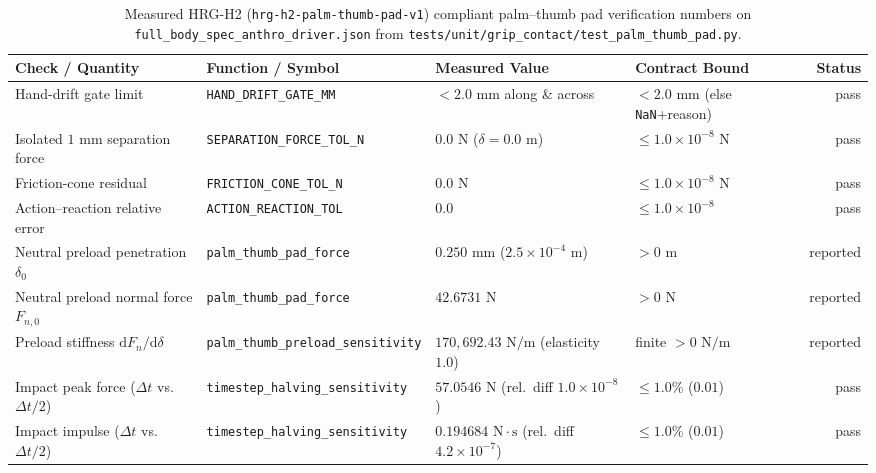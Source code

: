 \documentclass[11pt,a4paper]{article}
\begin{document}
\begin{table}[htbp]
\centering
\scriptsize
\begin{tabular}{llllr}
\toprule
\textbf{Check / Quantity} & \textbf{Function / Symbol} & \textbf{Measured Value} & \textbf{Contract Bound} & \textbf{Status} \\
\midrule
Hand-drift gate limit & \texttt{HAND\_DRIFT\_GATE\_MM} & $< 2.0\text{ mm}$ along \& across & $< 2.0\text{ mm}$ (else \texttt{NaN}+reason) & pass \\
Isolated $1\text{ mm}$ separation force & \texttt{SEPARATION\_FORCE\_TOL\_N} & $0.0\text{ N}$ ($\delta = 0.0\text{ m}$) & $\le 1.0\times 10^{-8}\text{ N}$ & pass \\
Friction-cone residual & \texttt{FRICTION\_CONE\_TOL\_N} & $0.0\text{ N}$ & $\le 1.0\times 10^{-8}\text{ N}$ & pass \\
Action--reaction relative error & \texttt{ACTION\_REACTION\_TOL} & $0.0$ & $\le 1.0\times 10^{-8}$ & pass \\
Neutral preload penetration $\delta_0$ & \texttt{palm\_thumb\_pad\_force} & $0.250\text{ mm}$ ($2.5\times 10^{-4}\text{ m}$) & $> 0\text{ m}$ & reported \\
Neutral preload normal force $F_{n,0}$ & \texttt{palm\_thumb\_pad\_force} & $42.6731\text{ N}$ & $> 0\text{ N}$ & reported \\
Preload stiffness $\mathrm{d}F_n/\mathrm{d}\delta$ & \texttt{palm\_thumb\_preload\_sensitivity} & $170,692.43\text{ N/m}$ (elasticity $1.0$) & finite $> 0\text{ N/m}$ & reported \\
Impact peak force ($\Delta t$ vs.\ $\Delta t/2$) & \texttt{timestep\_halving\_sensitivity} & $57.0546\text{ N}$ (rel.\ diff $1.0\times 10^{-8}$) & $\le 1.0\%$ ($0.01$) & pass \\
Impact impulse ($\Delta t$ vs.\ $\Delta t/2$) & \texttt{timestep\_halving\_sensitivity} & $0.194684\text{ N}\cdot\text{s}$ (rel.\ diff $4.2\times 10^{-7}$) & $\le 1.0\%$ ($0.01$) & pass \\
\bottomrule
\end{tabular}
\caption{Measured HRG-H2 (\texttt{hrg-h2-palm-thumb-pad-v1}) compliant palm--thumb pad verification numbers on \texttt{full\_body\_spec\_anthro\_driver.json} from \texttt{tests/unit/grip\_contact/test\_palm\_thumb\_pad.py}.}
\label{tab:h2_palm_thumb_pad_contract}
\end{table}
\end{document}
